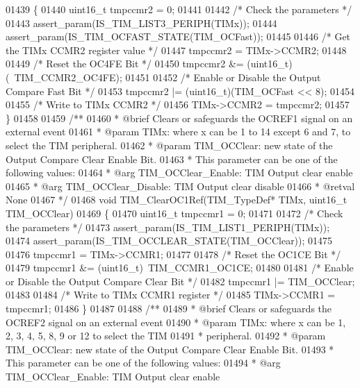 \begin{DoxyCode}
01439 \{
01440   uint16\_t tmpccmr2 = 0;
01441 
01442   \textcolor{comment}{/* Check the parameters */}
01443   assert_param(IS\_TIM\_LIST3\_PERIPH(TIMx));
01444   assert_param(IS\_TIM\_OCFAST\_STATE(TIM\_OCFast));
01445 
01446   \textcolor{comment}{/* Get the TIMx CCMR2 register value */}
01447   tmpccmr2 = TIMx->CCMR2;
01448 
01449   \textcolor{comment}{/* Reset the OC4FE Bit */}
01450   tmpccmr2 &= (uint16\_t)(~TIM_CCMR2_OC4FE);
01451 
01452   \textcolor{comment}{/* Enable or Disable the Output Compare Fast Bit */}
01453   tmpccmr2 |= (uint16\_t)(TIM\_OCFast << 8);
01454 
01455   \textcolor{comment}{/* Write to TIMx CCMR2 */}
01456   TIMx->CCMR2 = tmpccmr2;
01457 \}
01458 
01459 \textcolor{comment}{/**}
01460 \textcolor{comment}{  * @brief  Clears or safeguards the OCREF1 signal on an external event}
01461 \textcolor{comment}{  * @param  TIMx: where x can be 1 to 14 except 6 and 7, to select the TIM peripheral.}
01462 \textcolor{comment}{  * @param  TIM\_OCClear: new state of the Output Compare Clear Enable Bit.}
01463 \textcolor{comment}{  *          This parameter can be one of the following values:}
01464 \textcolor{comment}{  *            @arg TIM\_OCClear\_Enable: TIM Output clear enable}
01465 \textcolor{comment}{  *            @arg TIM\_OCClear\_Disable: TIM Output clear disable}
01466 \textcolor{comment}{  * @retval None}
01467 \textcolor{comment}{  */}
01468 \textcolor{keywordtype}{void} TIM_ClearOC1Ref(TIM\_TypeDef* TIMx, uint16\_t TIM\_OCClear)
01469 \{
01470   uint16\_t tmpccmr1 = 0;
01471 
01472   \textcolor{comment}{/* Check the parameters */}
01473   assert_param(IS\_TIM\_LIST1\_PERIPH(TIMx));
01474   assert_param(IS\_TIM\_OCCLEAR\_STATE(TIM\_OCClear));
01475 
01476   tmpccmr1 = TIMx->CCMR1;
01477 
01478   \textcolor{comment}{/* Reset the OC1CE Bit */}
01479   tmpccmr1 &= (uint16\_t)~TIM_CCMR1_OC1CE;
01480 
01481   \textcolor{comment}{/* Enable or Disable the Output Compare Clear Bit */}
01482   tmpccmr1 |= TIM\_OCClear;
01483 
01484   \textcolor{comment}{/* Write to TIMx CCMR1 register */}
01485   TIMx->CCMR1 = tmpccmr1;
01486 \}
01487 
01488 \textcolor{comment}{/**}
01489 \textcolor{comment}{  * @brief  Clears or safeguards the OCREF2 signal on an external event}
01490 \textcolor{comment}{  * @param  TIMx: where x can be  1, 2, 3, 4, 5, 8, 9 or 12 to select the TIM }
01491 \textcolor{comment}{  *         peripheral.}
01492 \textcolor{comment}{  * @param  TIM\_OCClear: new state of the Output Compare Clear Enable Bit.}
01493 \textcolor{comment}{  *          This parameter can be one of the following values:}
01494 \textcolor{comment}{  *            @arg TIM\_OCClear\_Enable: TIM Output clear enable}

\end{DoxyCode}
